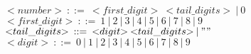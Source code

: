 \noindent
$ {<}number{>}\:::=\:{<}first\_digit{>}\:{<}tail\_digits{>}\:|\:\text{0} $\\
$ {<}first\_digit{>}\:::=\:\text{1}\:|\:\text{2}\:|\:\text{3}\:|\:\text{4}\:|\:\text{5}\:|\:\text{6}\:|\:\text{7}\:|\:\text{8}\:|\:\text{9} $\\
$ {<}tail\_digits{>}\:::=\:{<}digit{>}\:{<}tail\_digits{>}\:|\:"" $\\
$ {<}digit{>}\:::=\:\text{0}\:|\:\text{1}\:|\:\text{2}\:|\:\text{3}\:|\:\text{4}\:|\:\text{5}\:|\:\text{6}\:|\:\text{7}\:|\:\text{8}\:|\:\text{9} $